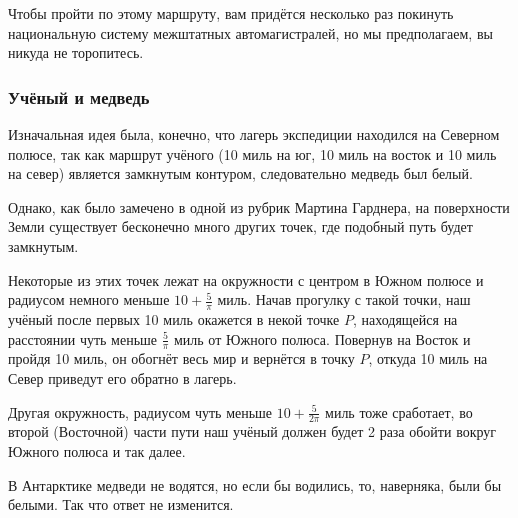 Чтобы пройти по этому маршруту, вам придётся несколько раз %
покинуть национальную систему межштатных автомагистралей, но мы предполагаем, вы никуда не торопитесь.

\subsubsection*{Учёный и медведь}%

Изначальная идея была, конечно, что лагерь экспедиции находился на Северном полюсе, так как маршрут учёного (10 миль на юг, 10 миль на восток и 10 миль на север) является замкнутым контуром, %
следовательно медведь был белый.

Однако, как было замечено в одной из рубрик %
Мартина Гарднера, %
на поверхности Земли существует бесконечно много других точек, где подобный путь будет замкнутым.

Некоторые из этих точек лежат на окружности с центром в Южном полюсе и радиусом немного меньше $10 + \tfrac5\pi$ миль.
Начав прогулку с такой точки, наш учёный после первых 10 миль окажется в некой точке $P$, 
находящейся на расстоянии чуть меньше $\tfrac5\pi$ миль от Южного полюса.
Повернув на Восток и пройдя 10 миль, он обогнёт весь мир и вернётся в точку $P$, откуда 10 миль на Север приведут его обратно в лагерь.

Другая окружность, радиусом чуть меньше $10 + \tfrac5{2\pi}$ миль тоже сработает, во второй (Восточной) части пути наш учёный должен будет 2 раза обойти вокруг Южного полюса и так далее.

В Антарктике медведи не водятся, но если бы водились, то, наверняка, были бы белыми.
Так что ответ не изменится.\heart
